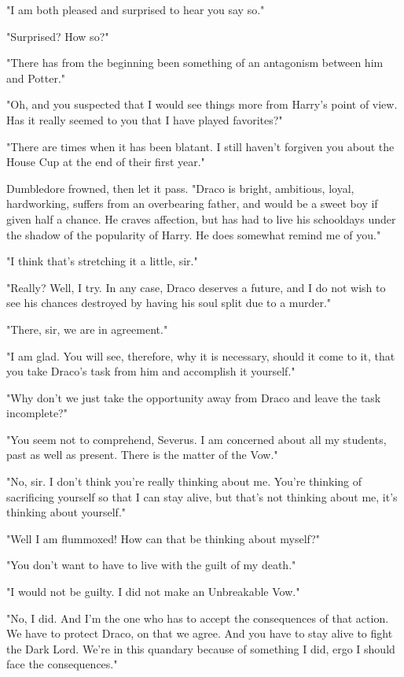 "I am{\el} both pleased and surprised to hear you say so."

"Surprised? How so?"

"There has from the beginning been something of an antagonism between him and{\el} Potter."

"Oh, and you suspected that I would see things more from Harry's point of view. Has it really seemed to you that I have played favorites?"

"There are times when it has been blatant. I still haven't forgiven you about the House Cup at the end of their first year."

Dumbledore frowned, then let it pass. "Draco is bright, ambitious, loyal, hardworking, suffers from an overbearing father, and would be a sweet boy if given half a chance. He craves affection, but has had to live his schooldays under the shadow of the popularity of Harry. He does somewhat remind me of you."

"I think that's stretching it a little, sir."

"Really? Well, I try. In any case, Draco deserves a future, and I do not wish to see his chances destroyed by having his soul split due to a murder."

"There, sir, we are in agreement."

"I am glad. You will see, therefore, why it is necessary, should it come to it, that you take Draco's task from him and accomplish it yourself."

"Why don't we just take the opportunity away from Draco and leave the task incomplete?"

"You seem not to comprehend, Severus. I am concerned about all my students, past as well as present. There is the matter of the Vow."

"No, sir. I don't think you're really thinking about me. You're thinking of sacrificing yourself so that I can stay alive, but that's not thinking about me, it's thinking about yourself."

"Well I am flummoxed! How can that be thinking about myself?"

"You don't want to have to live with the guilt of my death."

"I would not be guilty. I did not make an Unbreakable Vow."

"No, I did. And I'm the one who has to accept the consequences of that action. We have to protect Draco, on that we agree. And you have to stay alive to fight the Dark Lord. We're in this quandary because of something I did, ergo I should face the consequences."

